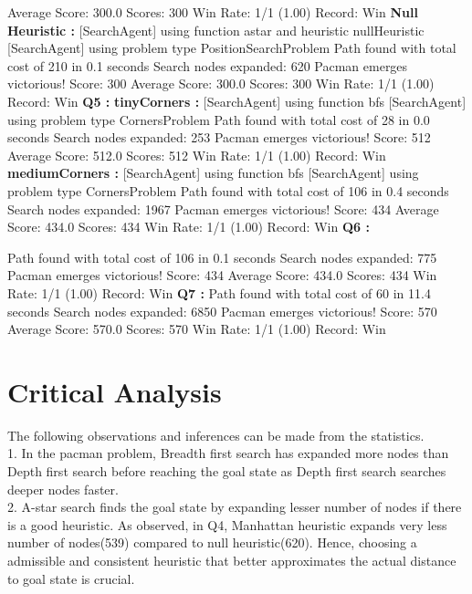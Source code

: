 \documentclass[11pt]{article}
\begin{document}
Average Score: 300.0
Scores:        300
Win Rate:      1/1 (1.00)
Record:        Win
{\bf Null Heuristic :}
[SearchAgent] using function astar and heuristic nullHeuristic
[SearchAgent] using problem type PositionSearchProblem
Path found with total cost of 210 in 0.1 seconds
Search nodes expanded: 620
Pacman emerges victorious! Score: 300
Average Score: 300.0
Scores:        300
Win Rate:      1/1 (1.00)
Record:        Win
{\bf Q5 :}
{\bf tinyCorners :}
[SearchAgent] using function bfs
[SearchAgent] using problem type CornersProblem
Path found with total cost of 28 in 0.0 seconds
Search nodes expanded: 253
Pacman emerges victorious! Score: 512
Average Score: 512.0
Scores:        512
Win Rate:      1/1 (1.00)
Record:        Win
{\bf mediumCorners :}
[SearchAgent] using function bfs
[SearchAgent] using problem type CornersProblem
Path found with total cost of 106 in 0.4 seconds
Search nodes expanded: 1967
Pacman emerges victorious! Score: 434
Average Score: 434.0
Scores:        434
Win Rate:      1/1 (1.00)
Record:        Win
{\bf Q6 :}

Path found with total cost of 106 in 0.1 seconds
Search nodes expanded: 775
Pacman emerges victorious! Score: 434
Average Score: 434.0
Scores:        434
Win Rate:      1/1 (1.00)
Record:        Win
{\bf Q7 :}
Path found with total cost of 60 in 11.4 seconds
Search nodes expanded: 6850
Pacman emerges victorious! Score: 570
Average Score: 570.0
Scores:        570
Win Rate:      1/1 (1.00)
Record:        Win
\egroup

\section{Critical Analysis}
The following observations and inferences can be made from the statistics.\\
1. In the pacman problem,  Breadth first search has expanded  more nodes than Depth first search  before reaching the goal state  as Depth first search searches deeper nodes faster.\\

2. A-star search finds the goal state by expanding lesser number of nodes if there is a good  heuristic. As observed, in Q4,  Manhattan heuristic expands very less number of nodes(539) compared to null heuristic(620). Hence, choosing a admissible and consistent heuristic that better approximates the actual distance to goal state is crucial.\\
\end{document}
